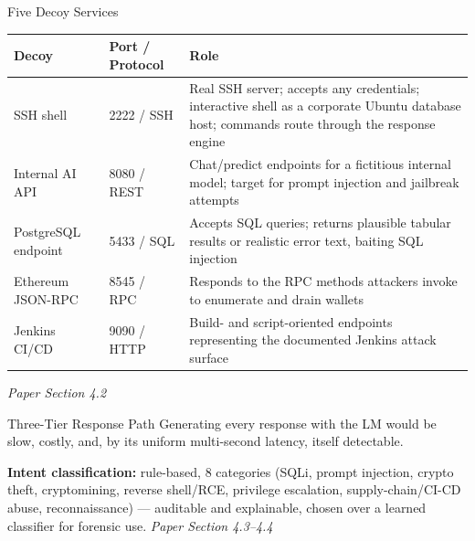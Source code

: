 \documentclass[aspectratio=169, 11pt]{beamer}
\newcommand{\srcnote}[1]{{\footnotesize\color{gray}\textit{#1}}}
\begin{document}
\begin{frame}{Five Decoy Services}
    \scriptsize
    \renewcommand{\arraystretch}{1.05}
    \setlength{\tabcolsep}{4pt}
    \begin{tabular}{|l|l|p{7.4cm}|}
        \hline
        \textbf{Decoy} & \textbf{Port / Protocol} & \textbf{Role} \\
        \hline
        SSH shell & 2222 / SSH & Real SSH server; accepts any credentials; interactive shell as a corporate Ubuntu database host; commands route through the response engine \\
        \hline
        Internal AI API & 8080 / REST & Chat/predict endpoints for a fictitious internal model; target for prompt injection and jailbreak attempts \\
        \hline
        PostgreSQL endpoint & 5433 / SQL & Accepts SQL queries; returns plausible tabular results or realistic error text, baiting SQL injection \\
        \hline
        Ethereum JSON-RPC & 8545 / RPC & Responds to the RPC methods attackers invoke to enumerate and drain wallets \\
        \hline
        Jenkins CI/CD & 9090 / HTTP & Build- and script-oriented endpoints representing the documented Jenkins attack surface \\
        \hline
    \end{tabular}
    \vspace{1mm}
    \srcnote{Paper Section 4.2}
\end{frame}

\begin{frame}{Three-Tier Response Path}
    \small Generating every response with the LM would be slow, costly, and, by its uniform multi-second latency, itself detectable.
    \begin{center}
    \end{center}
    \small\textbf{Intent classification:} rule-based, 8 categories (SQLi, prompt injection, crypto theft, cryptomining, reverse shell/RCE, privilege escalation, supply-chain/CI-CD abuse, reconnaissance) --- auditable and explainable, chosen over a learned classifier for forensic use.
    \srcnote{Paper Section 4.3--4.4}
\end{frame}
\end{document}
